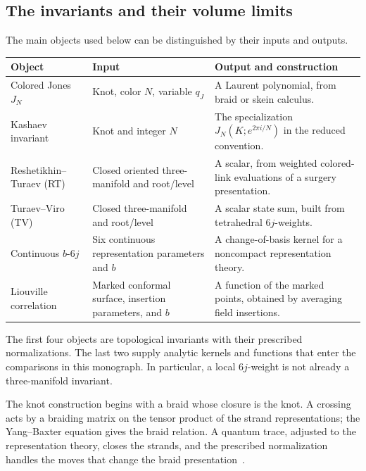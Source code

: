 \documentclass[11pt,a4paper]{article}
\numberwithin{equation}{section}
\theoremstyle{definition}
\theoremstyle{remark}
\begin{document}
\subsection{The invariants and their volume limits}
\label{sec:introinvariants}

The main objects used below can be distinguished by their inputs and
outputs.
\begin{center}
\small
\begin{tabular}{@{}>{\raggedright\arraybackslash}p{}>{\raggedright\arraybackslash}p{}>{\raggedright\arraybackslash}p{}@{}}
\toprule
Object & Input & Output and construction\\
\midrule
Colored Jones $J_N$ & Knot, color $N$, variable $q_J$
& A Laurent polynomial, from braid or skein calculus.\\[4pt]
Kashaev invariant & Knot and integer $N$
& The specialization $J_N(K;e^{2\pi i/N})$ in the reduced convention.\\[4pt]
Reshetikhin--Turaev (RT) & Closed oriented three-manifold and root/level
& A scalar, from weighted colored-link evaluations of a surgery presentation.\\[4pt]
Turaev--Viro (TV) & Closed three-manifold and root/level
& A scalar state sum, built from tetrahedral $6j$-weights.\\[4pt]
Continuous $b$-$6j$ & Six continuous representation parameters and $b$
& A change-of-basis kernel for a noncompact representation theory.\\[4pt]
Liouville correlation & Marked conformal surface, insertion parameters, and $b$
& A function of the marked points, obtained by averaging field insertions.\\
\bottomrule
\end{tabular}
\end{center}
The first four objects are topological invariants with their prescribed
normalizations. The last two supply analytic kernels and functions
that enter the comparisons in this monograph. In particular, a local
$6j$-weight is not already a three-manifold invariant.

The knot construction begins with a braid whose closure is the knot.
A crossing acts by a braiding matrix on the tensor product of the
strand representations; the Yang--Baxter equation gives the braid
relation. A quantum trace, adjusted to the representation theory,
closes the strands, and the prescribed normalization handles the
moves that change the braid presentation~\cite[Section 2]{MurakamiIntro}.
\end{document}
